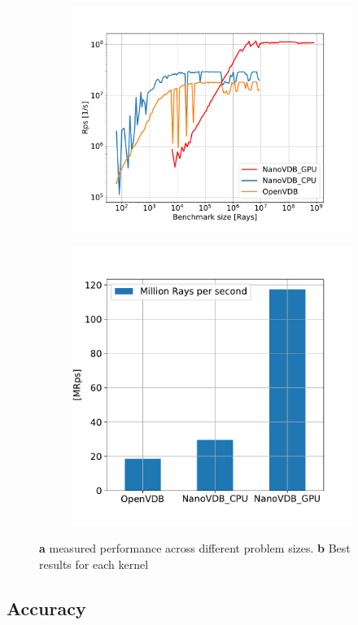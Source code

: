 \begin{figure}[h]
    \begin{subfigure}{0.5\textwidth}
        \includegraphics[width=1\linewidth]{res/results.pdf}
        \caption{}

    \end{subfigure}
    \begin{subfigure}{0.4\textwidth}
        \includegraphics[width=1\linewidth]{res/barplot.pdf}
        \caption{}
    \end{subfigure}

    \caption{\textbf{a} measured performance across different problem sizes. \textbf{b} Best results for each kernel}
    \label{fig:results}
\end{figure}

\subsection{Accuracy}



\nocite{openvdb}
\nocite{nanovdb}

